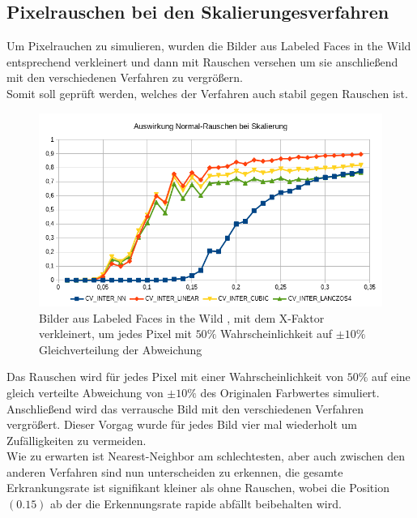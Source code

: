 \subsection{Pixelrauschen bei den Skalierungesverfahren}
Um Pixelrauchen zu simulieren, wurden die Bilder aus Labeled Faces in the Wild \cite{database_Face} entsprechend verkleinert und dann mit Rauschen versehen um sie anschließend mit den verschiedenen Verfahren zu vergrößern.\\
Somit soll geprüft werden, welches der Verfahren auch stabil gegen Rauschen ist.
\begin{figure}
	\centering
	\includegraphics[width=0.7\linewidth]{img/Hochskalliern_Nois}
	\caption{Bilder aus Labeled Faces in the Wild \cite{database_Face}, mit dem X-Faktor verkleinert, um jedes Pixel mit $50\%$ Wahrscheinlichkeit auf $\pm 10\%$ Gleichverteilung der Abweichung}
	\label{img_hochskalliern_nois}
\end{figure}
Das Rauschen wird für jedes Pixel mit einer Wahrscheinlichkeit von $50\%$ auf eine gleich verteilte Abweichung von $\pm 10\%$ des Originalen Farbwertes simuliert. Anschließend wird das verrausche Bild mit den verschiedenen Verfahren vergrößert. Dieser Vorgag wurde für jedes Bild vier mal wiederholt um Zufälligkeiten zu vermeiden.\\
Wie zu erwarten ist Nearest-Neighbor am schlechtesten, aber auch zwischen den anderen Verfahren sind nun unterscheiden zu erkennen, die gesamte Erkrankungsrate ist signifikant kleiner als ohne Rauschen, wobei die Position $(0.15)$ ab der die Erkennungsrate rapide abfällt beibehalten wird.
